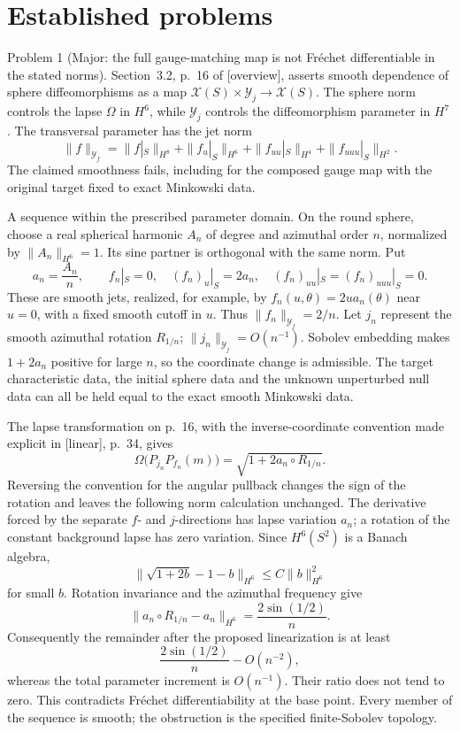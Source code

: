 \documentclass[10pt]{article}
\begin{document}
\section*{Established problems}
Problem 1 (Major: the full gauge-matching map is not Fréchet differentiable in the stated norms).  Section 3.2, p. 16 of [overview], asserts smooth dependence of sphere diffeomorphisms as a map \(\mathcal X(S)\times\mathcal Y_j\to\mathcal X(S)\). The sphere norm controls the lapse \(\Omega\) in \(H^6\), while \(\mathcal Y_j\) controls the diffeomorphism parameter in \(H^7\). The transversal parameter has the jet norm \[\|f\|_{\mathcal Y_f}=
 \|f|_S\|_{H^8}+\|f_u|_S\|_{H^6}
       +\|f_{uu}|_S\|_{H^4}+\|f_{uuu}|_S\|_{H^2}.\] The claimed smoothness fails, including for the composed gauge map with the original target fixed to exact Minkowski data.\par
A sequence within the prescribed parameter domain. On the round sphere, choose a real spherical harmonic \(A_n\) of degree and azimuthal order \(n\), normalized by \(\|A_n\|_{H^6}=1\). Its sine partner is orthogonal with the same norm. Put \[a_n=\frac{A_n}{n},\qquad
 f_n|_S=0,\quad (f_n)_u|_S=2a_n,\quad
 (f_n)_{uu}|_S=(f_n)_{uuu}|_S=0.\] These are smooth jets, realized, for example, by \(f_n(u,\theta)=2u
a_n(\theta)\) near \(u=0\), with a fixed smooth cutoff in \(u\). Thus \(\|f_n\|_{\mathcal Y_f}=2/n\). Let \(j_n\) represent the smooth azimuthal rotation \(R_{1/n}\); \(\|j_n\|_{\mathcal Y_j}=O(n^{-1})\). Sobolev embedding makes \(1+2a_n\) positive for large \(n\), so the coordinate change is admissible. The target characteristic data, the initial sphere data and the unknown unperturbed null data can all be held equal to the exact smooth Minkowski data.\par
The lapse transformation on p. 16, with the inverse-coordinate convention made explicit in [linear], p. 34, gives \[\Omega\bigl(P_{j_n}P_{f_n}(m)\bigr)
       =\sqrt{1+2a_n\circ R_{1/n}}.\] Reversing the convention for the angular pullback changes the sign of the rotation and leaves the following norm calculation unchanged. The derivative forced by the separate \(f\)- and \(j\)-directions has lapse variation \(a_n\); a rotation of the constant background lapse has zero variation. Since \(H^6(S^2)\) is a Banach algebra, \[\bigl\|\sqrt{1+2b}-1-b\bigr\|_{H^6}
       \leq C\|b\|_{H^6}^2\] for small \(b\). Rotation invariance and the azimuthal frequency give \[\|a_n\circ R_{1/n}-a_n\|_{H^6}
             =\frac{2\sin(1/2)}{n}.\] Consequently the remainder after the proposed linearization is at least \[\frac{2\sin(1/2)}{n}-O(n^{-2}),\] whereas the total parameter increment is \(O(n^{-1})\). Their ratio does not tend to zero. This contradicts Fréchet differentiability at the base point. Every member of the sequence is smooth; the obstruction is the specified finite-Sobolev topology.\par
\end{document}

